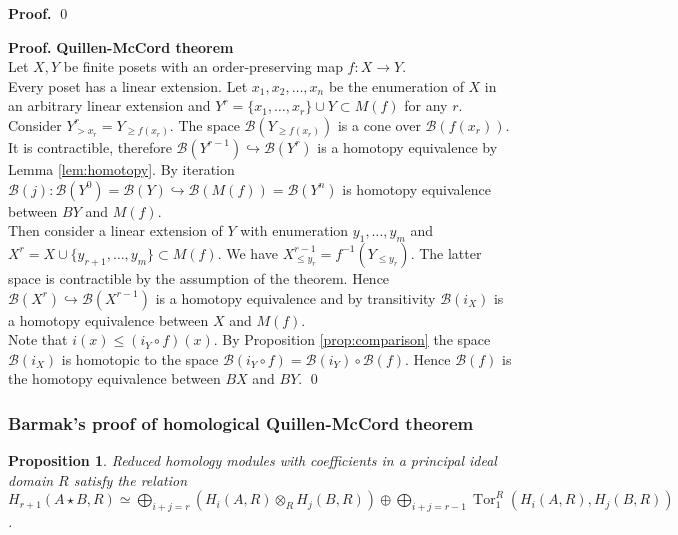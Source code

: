 \documentclass[english,12pt]{article}
\newcounter{stmcounter}[section]
\numberwithin{equation}{section}
\newtheorem{proposition}[stmcounter]{Proposition}
\theoremstyle{definition}
\theoremstyle{remark}
\newenvironment{pf}{\noindent\textbf{Proof.}}{\qed}
\renewcommand{\leq}{\leqslant}
\renewcommand{\geq}{\geqslant}
\begin{document}
\begin{pf}
\end{pf}

\begin{pf} \textbf{Quillen-McCord theorem}\\
  Let $X, Y$ be finite posets with an order-preserving map $f : X \to Y$.\\

  Every poset has a linear extension. Let $x_1, x_2, \ldots, x_n$ be the enumeration of $X$ in an arbitrary linear extension and $Y^r = \{x_1,\ldots,x_r\} \cup Y \subset M(f)$ for any $r$.\\

  Consider $Y^r_{>x_r} = Y_{\geq f(x_r)}$. The space $\mathcal{B}(Y_{\geq f(x_r)})$ is a cone over $\mathcal{B}(f(x_r))$. It is contractible, therefore $\mathcal{B}(Y^{r-1}) \hookrightarrow \mathcal{B}(Y^{r})$ is a homotopy equivalence by Lemma \ref{lem:homotopy}. By iteration $\mathcal{B}(j) : \mathcal{B}(Y^{0}) = \mathcal{B}(Y) \hookrightarrow \mathcal{B}(M(f)) = \mathcal{B}(Y^n)$ is homotopy equivalence between $BY$ and $M(f)$.\\

  Then consider a linear extension of $Y$ with enumeration $y_1,\ldots,y_m$ and $X^r = X \cup \{y_{r+1},\ldots,y_m\} \subset M(f)$. We have $X^{r-1}_{\leq y_r} = f^{-1}(Y_{\leqslant y_r})$. The latter space is contractible by the assumption of the theorem. Hence $\mathcal{B}(X^{r}) \hookrightarrow \mathcal{B}(X^{r-1})$ is a homotopy equivalence and by transitivity $\mathcal{B}(i_X)$ is a homotopy equivalence between $X$ and $M(f)$.\\

  Note that $i(x) \leqslant (i_Y \circ f)(x)$. By Proposition \ref{prop:comparison} the space $\mathcal{B}(i_X)$ is homotopic to the space $\mathcal{B}(i_Y \circ f) = \mathcal{B}(i_Y) \circ \mathcal{B}(f)$. Hence $\mathcal{B}(f)$ is the homotopy equivalence between $BX$ and $BY$.
\end{pf}

\subsubsection{Barmak's proof of homological Quillen-McCord theorem}

\begin{proposition} {\cite[Lemma 2.1]{Milnor56}}
  \label{prop:kunneth}
  Reduced homology modules with coefficients in a principal ideal domain $R$ satisfy the relation
  $H_{r+1}(A \star B, R) \simeq \bigoplus_{i+j=r}(H_i(A,R) \otimes_R H_j(B,R)) \oplus \bigoplus_{i+j=r-1} \operatorname{Tor}_1^R(H_i(A,R),H_j(B,R))$.
\end{proposition}
\end{document}
